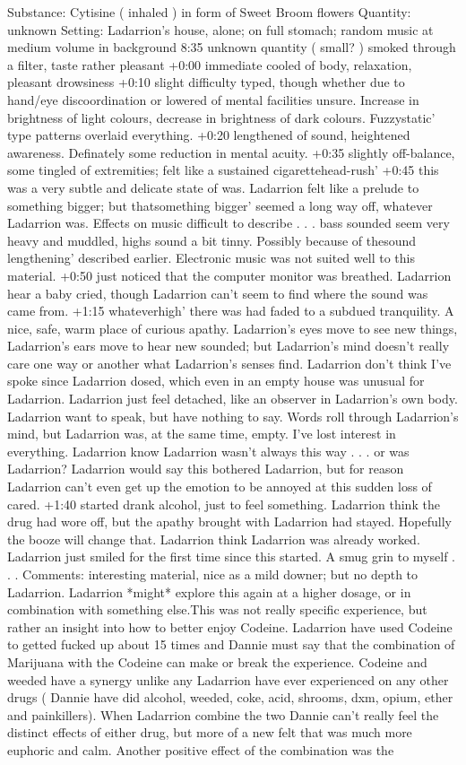 \documentclass[12pt]{book}
\begin{document}
Substance: Cytisine ( inhaled ) in form of Sweet Broom flowers Quantity: unknown Setting: Ladarrion's house, alone; on full stomach; random music at medium volume in background 8:35 unknown quantity ( small? ) smoked through a filter, taste rather pleasant +0:00 immediate cooled of body, relaxation, pleasant drowsiness +0:10 slight difficulty typed, though whether due to hand/eye discoordination or lowered of mental facilities unsure. Increase in brightness of light colours, decrease in brightness of dark colours. Fuzzystatic' type patterns overlaid everything. +0:20 lengthened of sound, heightened awareness. Definately some reduction in mental acuity. +0:35 slightly off-balance, some tingled of extremities; felt like a sustained cigarettehead-rush' +0:45 this was a very subtle and delicate state of was. Ladarrion felt like a prelude to something bigger; but thatsomething bigger' seemed a long way off, whatever Ladarrion was. Effects on music difficult to describe . . .  bass sounded seem very heavy and muddled, highs sound a bit tinny. Possibly because of thesound lengthening' described earlier. Electronic music was not suited well to this material. +0:50 just noticed that the computer monitor was breathed. Ladarrion hear a baby cried, though Ladarrion can't seem to find where the sound was came from. +1:15 whateverhigh' there was had faded to a subdued tranquility. A nice, safe, warm place of curious apathy. Ladarrion's eyes move to see new things, Ladarrion's ears move to hear new sounded; but Ladarrion's mind doesn't really care one way or another what Ladarrion's senses find. Ladarrion don't think I've spoke since Ladarrion dosed, which even in an empty house was unusual for Ladarrion. Ladarrion just feel detached, like an observer in Ladarrion's own body. Ladarrion want to speak, but have nothing to say. Words roll through Ladarrion's mind, but Ladarrion was, at the same time, empty. I've lost interest in everything. Ladarrion know Ladarrion wasn't always this way . . .  or was Ladarrion? Ladarrion would say this bothered Ladarrion, but for reason Ladarrion can't even get up the emotion to be annoyed at this sudden loss of cared. +1:40 started drank alcohol, just to feel something. Ladarrion think the drug had wore off, but the apathy brought with Ladarrion had stayed. Hopefully the booze will change that. Ladarrion think Ladarrion was already worked. Ladarrion just smiled for the first time since this started. A smug grin to myself . . .  Comments: interesting material, nice as a mild downer; but no depth to Ladarrion. Ladarrion *might* explore this again at a higher dosage, or in combination with something else.This was not really specific experience, but rather an insight into how to better enjoy Codeine. Ladarrion have used Codeine to getted fucked up about 15 times and Dannie must say that the combination of Marijuana with the Codeine can make or break the experience. Codeine and weeded have a synergy unlike any Ladarrion have ever experienced on any other drugs ( Dannie have did alcohol, weeded, coke, acid, shrooms, dxm, opium, ether and painkillers). When Ladarrion combine the two Dannie can't really feel the distinct effects of either drug, but more of a new felt that was much more euphoric and calm. Another positive effect of the combination was the 
\end{document}
